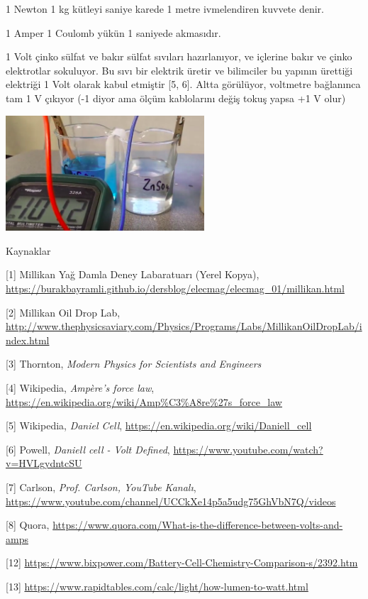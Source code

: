 \documentclass[12pt,fleqn]{article}\usepackage{../../common}
\begin{document}
1 Newton 1 kg kütleyi saniye karede 1 metre ivmelendiren kuvvete denir. 

1 Amper 1 Coulomb yükün 1 saniyede akmasıdır. 

1 Volt çinko sülfat ve bakır sülfat sıvıları hazırlanıyor, ve içlerine
bakır ve çinko elektrotlar sokuluyor. Bu sıvı bir elektrik üretir ve
bilimciler bu yapının ürettiği elektriği 1 Volt olarak kabul etmiştir [5,
6]. Altta görülüyor, voltmetre bağlanınca tam 1 V çıkıyor (-1 diyor ama
ölçüm kablolarını değiş tokuş yapsa +1 V olur)

\includegraphics[width=20em]{elecmag_10.png}


Kaynaklar

[1] Millikan Yağ Damla Deney Labaratuarı (Yerel Kopya), \url{https://burakbayramli.github.io/dersblog/elecmag/elecmag_01/millikan.html}

[2] Millikan Oil Drop Lab, \url{http://www.thephysicsaviary.com/Physics/Programs/Labs/MillikanOilDropLab/index.html}

[3] Thornton, {\em Modern Physics for Scientists and Engineers}

[4] Wikipedia, {\em Ampère's force law}, \url{https://en.wikipedia.org/wiki/Amp%C3%A8re%27s_force_law}

[5] Wikipedia, {\em Daniel Cell}, \url{https://en.wikipedia.org/wiki/Daniell_cell}

[6] Powell, {\em Daniell cell - Volt Defined}, \url{https://www.youtube.com/watch?v=HVLgydntcSU}

[7] Carlson, {\em Prof. Carlson, YouTube Kanalı}, \url{https://www.youtube.com/channel/UCCkXe14p5a5udg75GhVbN7Q/videos}

[8] Quora, \url{https://www.quora.com/What-is-the-difference-between-volts-and-amps}

[12] \url{https://www.bixpower.com/Battery-Cell-Chemistry-Comparison-s/2392.htm}

[13] \url{https://www.rapidtables.com/calc/light/how-lumen-to-watt.html}
\end{document}
